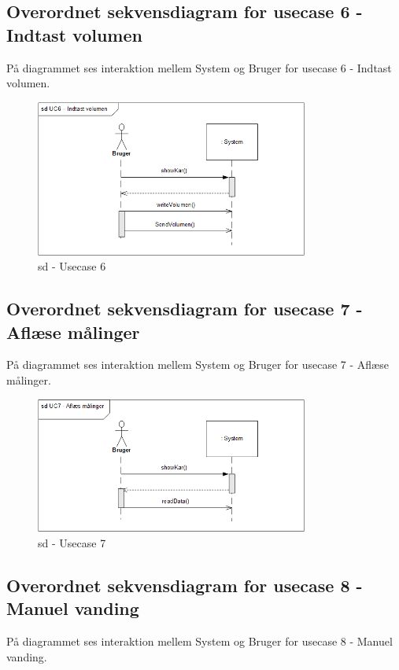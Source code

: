 \subsection*{Overordnet sekvensdiagram for usecase 6 - Indtast volumen}
På diagrammet ses interaktion mellem System og Bruger for usecase 6 - Indtast volumen.

\begin{figure}[H]
    \centering
    \includegraphics[width=0.8\textwidth]{Systemarkitektur/OverordnedeSekvensdiagrammer/sd_UC6.PNG}
    \caption{sd - Usecase 6}
    \label{fig:sd_UC6}
\end{figure}

\subsection*{Overordnet sekvensdiagram for usecase 7 - Aflæse målinger}
På diagrammet ses interaktion mellem System og Bruger for usecase 7 - Aflæse målinger.

\begin{figure}[H]
    \centering
    \includegraphics[width=0.8\textwidth]{Systemarkitektur/OverordnedeSekvensdiagrammer/sd_UC7.PNG}
    \caption{sd - Usecase 7}
    \label{fig:sd_UC6}
\end{figure}

\subsection*{Overordnet sekvensdiagram for usecase 8 - Manuel vanding}
På diagrammet ses interaktion mellem System og Bruger for usecase 8 - Manuel vanding.

